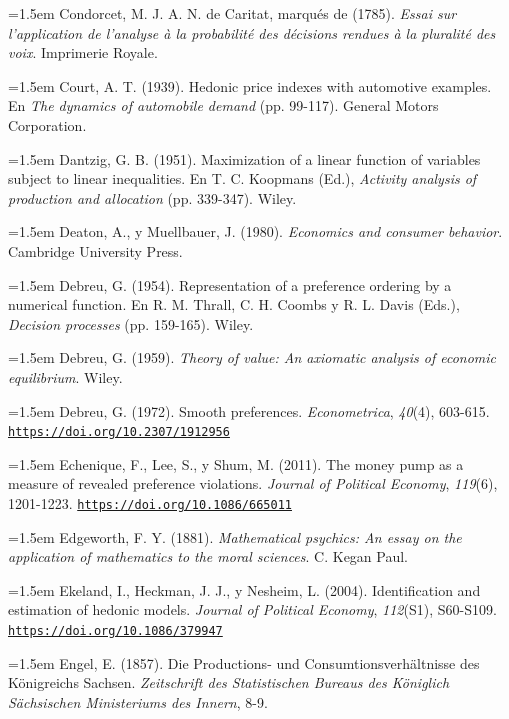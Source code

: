 \documentclass[10pt,a4paper]{article}
\begin{document}
\noindent\hangindent=1.5em Condorcet, M. J. A. N. de Caritat, marqués de (1785). \textit{Essai sur l'application de l'analyse à la probabilité des décisions rendues à la pluralité des voix}. Imprimerie Royale.

\noindent\hangindent=1.5em Court, A. T. (1939). Hedonic price indexes with automotive examples. En \textit{The dynamics of automobile demand} (pp. 99-117). General Motors Corporation.

\noindent\hangindent=1.5em Dantzig, G. B. (1951). Maximization of a linear function of variables subject to linear inequalities. En T. C. Koopmans (Ed.), \textit{Activity analysis of production and allocation} (pp. 339-347). Wiley.

\noindent\hangindent=1.5em Deaton, A., y Muellbauer, J. (1980). \textit{Economics and consumer behavior}. Cambridge University Press.

\noindent\hangindent=1.5em Debreu, G. (1954). Representation of a preference ordering by a numerical function. En R. M. Thrall, C. H. Coombs y R. L. Davis (Eds.), \textit{Decision processes} (pp. 159-165). Wiley.

\noindent\hangindent=1.5em Debreu, G. (1959). \textit{Theory of value: An axiomatic analysis of economic equilibrium}. Wiley.

\noindent\hangindent=1.5em Debreu, G. (1972). Smooth preferences. \textit{Econometrica}, \textit{40}(4), 603-615. \href{https://doi.org/10.2307/1912956}{\nolinkurl{https://doi.org/10.2307/1912956}}

\noindent\hangindent=1.5em Echenique, F., Lee, S., y Shum, M. (2011). The money pump as a measure of revealed preference violations. \textit{Journal of Political Economy}, \textit{119}(6), 1201-1223. \href{https://doi.org/10.1086/665011}{\nolinkurl{https://doi.org/10.1086/665011}}

\noindent\hangindent=1.5em Edgeworth, F. Y. (1881). \textit{Mathematical psychics: An essay on the application of mathematics to the moral sciences}. C. Kegan Paul.

\noindent\hangindent=1.5em Ekeland, I., Heckman, J. J., y Nesheim, L. (2004). Identification and estimation of hedonic models. \textit{Journal of Political Economy}, \textit{112}(S1), S60-S109. \href{https://doi.org/10.1086/379947}{\nolinkurl{https://doi.org/10.1086/379947}}

\noindent\hangindent=1.5em Engel, E. (1857). Die Productions- und Consumtionsverhältnisse des Königreichs Sachsen. \textit{Zeitschrift des Statistischen Bureaus des Königlich Sächsischen Ministeriums des Innern}, 8-9.
\end{document}
